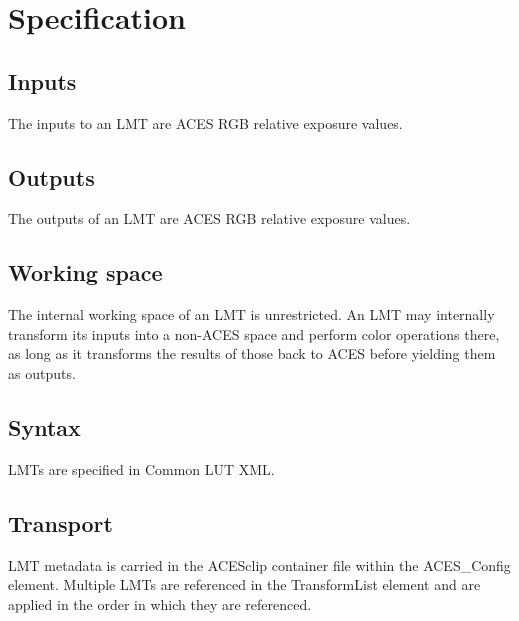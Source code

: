 \regularsectionformat
\chapter{Specification}

\section{Inputs}
The inputs to an LMT are ACES RGB relative exposure values.

\section{Outputs}
The outputs of an LMT are ACES RGB relative exposure values.

\section{Working space}
The internal working space of an LMT is unrestricted. An LMT may internally transform its inputs into a non-ACES space and perform color operations there, as long as it transforms the results of those back to ACES before yielding them as outputs.

\section{Syntax}
LMTs are specified in Common LUT XML.

\section{Transport}
LMT metadata is carried in the ACESclip container file within the ACES\_Config element. Multiple LMTs are referenced in the TransformList element and are applied in the order in which they are referenced.